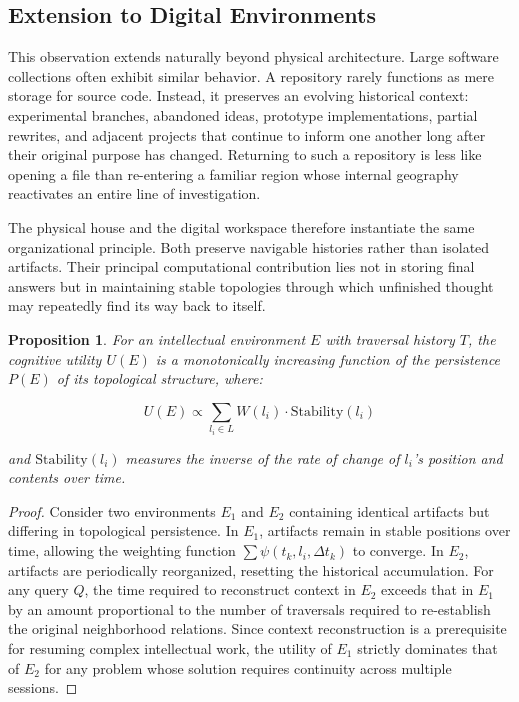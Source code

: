 \documentclass[12pt,oneside]{article}
\newtheorem{proposition}[definition]{Proposition}
\theoremstyle{remark}
\begin{document}
\subsection{Extension to Digital Environments}

This observation extends naturally beyond physical architecture. Large software collections often exhibit similar behavior. A repository rarely functions as mere storage for source code. Instead, it preserves an evolving historical context: experimental branches, abandoned ideas, prototype implementations, partial rewrites, and adjacent projects that continue to inform one another long after their original purpose has changed. Returning to such a repository is less like opening a file than re-entering a familiar region whose internal geography reactivates an entire line of investigation.

The physical house and the digital workspace therefore instantiate the same organizational principle. Both preserve navigable histories rather than isolated artifacts. Their principal computational contribution lies not in storing final answers but in maintaining stable topologies through which unfinished thought may repeatedly find its way back to itself.

\begin{proposition}
For an intellectual environment $E$ with traversal history $T$, the cognitive utility $U(E)$ is a monotonically increasing function of the persistence $P(E)$ of its topological structure, where:

\begin{equation}
U(E) \propto \sum_{l_i \in L} W(l_i) \cdot \text{Stability}(l_i)
\end{equation}

and $\text{Stability}(l_i)$ measures the inverse of the rate of change of $l_i$'s position and contents over time.
\end{proposition}

\begin{proof}
Consider two environments $E_1$ and $E_2$ containing identical artifacts but differing in topological persistence. In $E_1$, artifacts remain in stable positions over time, allowing the weighting function $\sum \psi(t_k, l_i, \Delta t_k)$ to converge. In $E_2$, artifacts are periodically reorganized, resetting the historical accumulation. For any query $Q$, the time required to reconstruct context in $E_2$ exceeds that in $E_1$ by an amount proportional to the number of traversals required to re-establish the original neighborhood relations. Since context reconstruction is a prerequisite for resuming complex intellectual work, the utility of $E_1$ strictly dominates that of $E_2$ for any problem whose solution requires continuity across multiple sessions. 
\end{proof}
\end{document}

